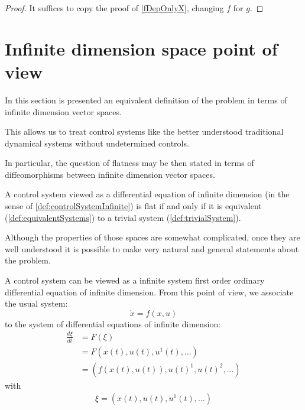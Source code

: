 \documentclass[12pt]{article}
\begin{document}
\begin{lemma}
  \label{gDepOnlyX}
\end{lemma}
\begin{proof}
  It suffices to copy the proof of \ref{fDepOnlyX}, changing $f$ for $g$.
\end{proof}

\section{Infinite dimension space point of view} \label{secInfiniteDimesionSpace}

In this section is presented an equivalent definition of the problem in terms
of infinite dimension vector spaces.

This allows us to treat control systems like the better understood traditional
dynamical systems without undetermined controls.

In particular, the question of flatness may be then stated in terms of
diffeomorphisms between infinite dimension vector spaces.

A control system viewed as a differential equation of infinite dimension
(in the sense of \ref{def:controlSystemInfinite}) is flat if and only if it
is equivalent (\ref{def:equivalentSystems}) to a trivial system (\ref{def:trivialSystem}).

Although the properties of those spaces are somewhat complicated, once they
are well understood it is possible to make very natural and general statements
about the problem.

\begin{definition} \label{def:controlSystemInfinite}
  A control system can be viewed as a infinite system first order ordinary
  differential equation of infinite dimension.
  From this point of view, we associate the usual system:
  \[\dot{x}=f(x,u)\]
  to the system of differential equations of infinite dimension:
  \begin{align*}
    \frac{d\xi}{dt} &= F(\xi) \\
    &= F(x(t),u(t),u^1(t),\ldots) \\
    &= (f(x(t),u(t)),u(t)^1,u(t)^2,\ldots)
  \end{align*}
  with
  \begin{align*}
    \xi = (x(t),u(t),u^1(t),\ldots)    
  \end{align*}  
\end{definition}
\end{document}
